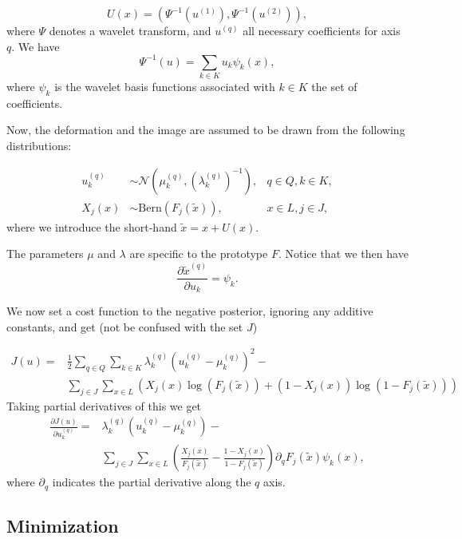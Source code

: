 \documentclass{report}
\begin{document}
\[
    U(x) = (\Psi^{-1}(u^{(1)}), \Psi^{-1}(u^{(2)})),
\]
where $\Psi$ denotes a wavelet transform, and $u^{(q)}$ all necessary coefficients for axis $q$. We have
\[
    \Psi^{-1}(u) = \sum_{k\in K} u_k \psi_k(x),
\]
where $\psi_k$ is the wavelet basis functions associated with $k \in K$ the set of coefficients.

Now, the deformation and the image are assumed to be drawn from the following distributions:

\begin{align}
    u^{(q)}_{k} &\sim \mathcal{N}(\mu^{(q)}_{k}, (\lambda^{(q)}_{k})^{-1}), &q \in Q, k \in K, \label{eq:gaussian} \\
    X_j(x) &\sim \text{Bern}(F_j(\tilde x)), &x \in L, j \in J, \label{eq:bernoulli}
 \end{align}
where we introduce the short-hand $\tilde x = x + U(x)$.

The parameters $\mu$ and $\lambda$ are specific to the prototype $F$.
Notice that we then have
\begin{equation} \label{eq:partial_tilde}
    \frac{\partial \tilde x^{(q)}}{\partial u_k} = \psi_k.
\end{equation}

We now set a cost function to the negative posterior, ignoring any additive constants, and get (not be confused with the set $J$)

\begin{align*}
    J(u) =& \frac{1}{2} \sum_{q\in Q} \sum_{k\in K} \lambda^{(q)}_k (u^{(q)}_k -\mu^{(q)}_k)^2 - \\
        &\sum_{j\in J} \sum_{x \in L}  \left( 
            X_j(x) \log(F_j(\tilde x))   +   (1-X_j(x)) \log(1-F_j(\tilde x)) \right)
\end{align*}
Taking partial derivatives of this we get
\begin{align*}
    \frac{\partial J(u)}{\partial u^{(q)}_k} =& \lambda^{(q)}_k (u^{(q)}_k -\mu^{(q)}_k) - \\    
    & \sum_{j\in J} \sum_{x \in L} 
        \left( \frac{X_j(x)}{F_j(\tilde x)} - \frac{1-X_j(x)}{1-F_j(\tilde x)} \right) 
                \partial_q F_j(\tilde x) \psi_k(x),
\end{align*} 
where $\partial_q$ indicates the partial derivative along the $q$ axis.

\subsection{Minimization}
\end{document}
